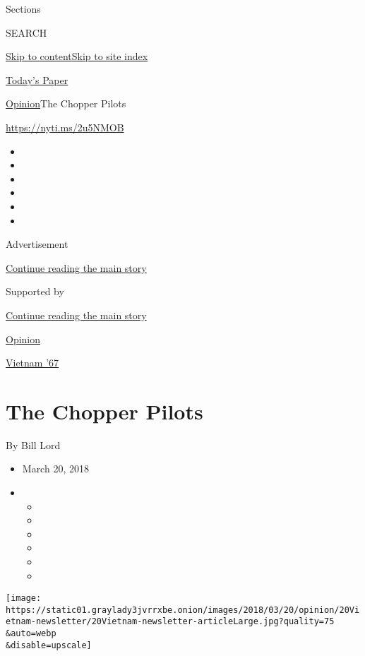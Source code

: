 Sections

SEARCH

\protect\hyperlink{site-content}{Skip to
content}\protect\hyperlink{site-index}{Skip to site index}

\href{https://myaccount.nytimes3xbfgragh.onion/auth/login?response_type=cookie\&client_id=vi}{}

\href{https://www.nytimes3xbfgragh.onion/section/todayspaper}{Today's
Paper}

\href{/section/opinion}{Opinion}\textbar{}The Chopper Pilots

\url{https://nyti.ms/2u5NMOB}

\begin{itemize}
\item
\item
\item
\item
\item
\item
\end{itemize}

Advertisement

\protect\hyperlink{after-top}{Continue reading the main story}

Supported by

\protect\hyperlink{after-sponsor}{Continue reading the main story}

\href{/section/opinion}{Opinion}

\href{/column/vietnam-67}{Vietnam '67}

\hypertarget{the-chopper-pilots}{%
\section{The Chopper Pilots}\label{the-chopper-pilots}}

By Bill Lord

\begin{itemize}
\item
  March 20, 2018
\item
  \begin{itemize}
  \item
  \item
  \item
  \item
  \item
  \item
  \end{itemize}
\end{itemize}

\texttt{[image: https://static01.graylady3jvrrxbe.onion/images/2018/03/20/opinion/20Vietnam-newsletter/20Vietnam-newsletter-articleLarge.jpg?quality=75\\\&auto=webp\\\&disable=upscale]}

